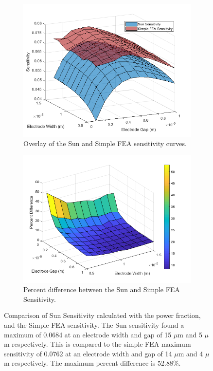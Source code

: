 \begin{figure}[h]
    \centering
    \begin{subfigure}{0.49\textwidth}
        \centering
        \includegraphics[width=\textwidth]{images/SunVsSimpleSensitivity.png}
        \caption{Overlay of the Sun and Simple FEA sensitivity curves.}
    \end{subfigure}
    \hfill
    \begin{subfigure}{0.49\textwidth}
        \centering
        \includegraphics[width=\textwidth]{images/SunVsSimplePercentDiff.png}
        \caption{Percent difference between the Sun and Simple FEA Sensitivity.}
    \end{subfigure}
    \caption{Comparison of Sun Sensitivity calculated with the power fraction, and the Simple FEA sensitivity. The Sun sensitivity found a maximum of 0.0684 at an electrode width and gap of 15 $\mu$m and 5 $\mu$m respectively. This is compared to the simple FEA maximum sensitivity of 0.0762 at an electrode width and gap of 14 $\mu$m and 4 $\mu$m respectively. The maximum percent difference is 52.88\%.}
    \label{fig:sunVsSimpleSensitivity}
\end{figure}

